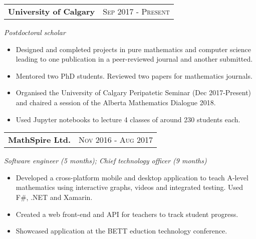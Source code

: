 \documentclass[a4paper,10pt]{article}
\begin{document}
\begin{tabu}{X[1, l]X[1 r]}
{\bf University of Calgary}&\textsc{Sep 2017 - Present}\\
\end{tabu}
\emph{Postdoctoral scholar}
\begin{itemize}
  \item Designed and completed projects in pure mathematics and computer science leading to one publication in a peer-reviewed journal and another submitted.
  \item Mentored two PhD students. Reviewed two papers for mathematics journals.
  \item Organised the University of Calgary Peripatetic Seminar (Dec 2017-Present) and chaired a session of the Alberta Mathematics Dialogue 2018.
  \item Used Jupyter notebooks to lecture 4 classes of around 230 students each.
\end{itemize}

\begin{tabu}{X[1, l]X[1 r]}
{\bf MathSpire Ltd.}&\textsc{Nov 2016 - Aug 2017}\\
\end{tabu}
\emph{Software engineer (5 months); Chief technology officer (9 months)}  
\begin{itemize}
  \item Developed a cross-platform mobile and desktop application to teach A-level mathematics using interactive graphs, videos and integrated testing.
  Used F\#, .NET and Xamarin.
  \item Created a web front-end and API for teachers to track student progress.
  \item Showcased application at the BETT eduction technology conference.
\end{itemize}

\end{document}
